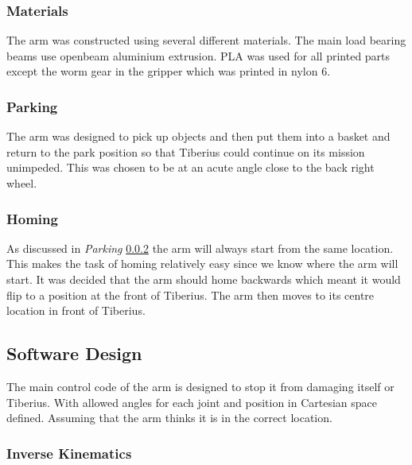 \subsubsection{Materials}
The arm was constructed using several different materials. The main load bearing beams use openbeam aluminium extrusion. PLA was used for all printed parts except the worm gear in the gripper which was printed in nylon 6.

\subsubsection{Parking} \label{parking}
The arm was designed to pick up objects and then put them into a basket and return to the park position so that Tiberius could continue on its mission unimpeded. This was chosen to be at an acute angle close to the back right wheel.

\subsubsection{Homing}
As discussed in \textit{Parking} \ref{parking} the arm will always start from the same location. This makes the task of homing relatively easy since we know where the arm will start. It was decided that the arm should home backwards which meant it would flip to a position at the front of Tiberius. The arm then moves to its centre location in front of Tiberius. 



\subsection{Software Design}
The main control code of the arm is designed to stop it from damaging itself or Tiberius. With allowed angles for each joint and position in Cartesian space defined. Assuming that the arm thinks it is in the correct location.

\subsubsection{Inverse Kinematics}

